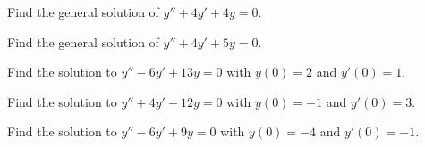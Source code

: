 \begin{exercise}
Find the general solution of $y'' + 4y' + 4y = 0$.
\end{exercise}

\begin{exercise}
Find the general solution of $y'' + 4y' + 5y = 0$.
\end{exercise}

\begin{exercise}
Find the solution to $y'' - 6y' + 13y = 0$ with $y(0) = 2$ and $y'(0) = 1$. 
\end{exercise}

\begin{exercise}
Find the solution to $y'' + 4y' - 12y = 0$ with $y(0) = -1$ and $y'(0) = 3$. 
\end{exercise}

\begin{exercise}
Find the solution to $y'' - 6y' + 9y = 0$ with $y(0) = -4$ and $y'(0) = -1$. 
\end{exercise}



